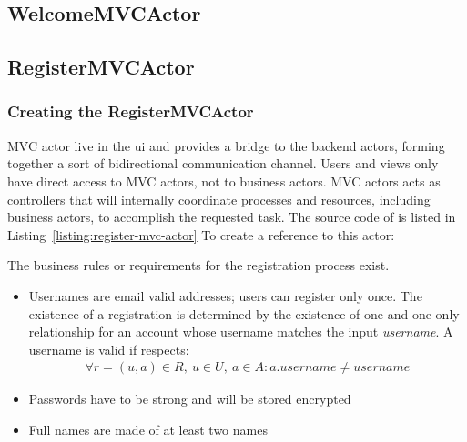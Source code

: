 \subsection{WelcomeMVCActor}
\label{sec:welcomemvcactor}




\subsection{RegisterMVCActor}
\label{sec:registermvcactor}




\subsubsection{Creating the RegisterMVCActor}
\label{sec:creat-regist}

MVC actor live in the ui and provides a bridge to the backend actors,
forming together a sort of bidirectional communication channel. Users
and views only have direct access to MVC actors, not to business
actors. MVC actors acts as controllers that will internally coordinate
processes and resources, including business actors, to accomplish the
requested task. The source code of  is listed
in Listing~\ref{listing:register-mvc-actor}
%
To create a reference to this actor:
% 
\label{listing:register-mvc-actor}
%







The business rules or requirements for the registration process exist.
\begin{itemize}
\item Usernames are email valid addresses; users can register only
  once. The existence of a registration is determined by the existence
  of one and one only  relationship for an account
  whose username matches the input \emph{username}. A username is
  valid if respects:
  \begin{align}
    \forall r = (u, a) \in R,\ u \in U,\ a \in A: a.username \neq
    username
  \end{align}
\item Passwords have to be strong and will be stored encrypted
\item Full names are made of at least two names
\end{itemize}
%

